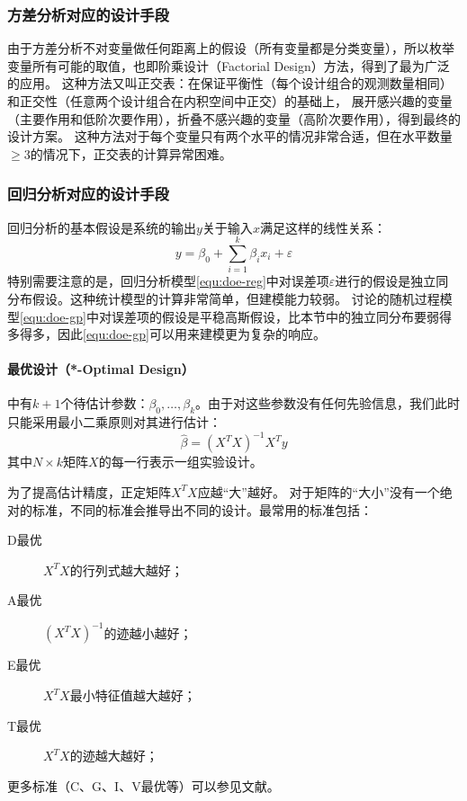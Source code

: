 \documentclass[index]{subfiles}
\begin{document}
\subsubsection{方差分析对应的设计手段}
由于方差分析不对变量做任何距离上的假设（所有变量都是分类变量），所以枚举变量所有可能的取值，也即阶乘设计（Factorial Design）方法，得到了最为广泛的应用。
这种方法又叫正交表\cite{刘瑞江2010}：在保证平衡性（每个设计组合的观测数量相同）和正交性（任意两个设计组合在内积空间中正交）的基础上，
展开感兴趣的变量（主要作用和低阶次要作用），折叠不感兴趣的变量（高阶次要作用），得到最终的设计方案。
这种方法对于每个变量只有两个水平的情况非常合适，但在水平数量$\geq3$的情况下，正交表的计算异常困难。

\subsubsection{回归分析对应的设计手段}\label{ssec:doe-reg}
回归分析的基本假设是系统的输出$y$关于输入$x$满足这样的线性关系\cite{montgomery}：
\begin{equation}\label{equ:doe-reg}
  y = \beta_0 + \sum_{i=1}^{k} \beta_i x_i + \varepsilon
\end{equation}
特别需要注意的是，回归分析模型\cref{equ:doe-reg}中对误差项$\varepsilon$进行的假设是独立同分布假设。这种统计模型的计算非常简单，但建模能力较弱。
讨论的随机过程模型\cref{equ:doe-gp}中对误差项的假设是平稳高斯假设，比本节中的独立同分布要弱得多得多，因此\cref{equ:doe-gp}可以用来建模更为复杂的响应。

\paragraph{最优设计（*-Optimal Design）}
中有$k+1$个待估计参数：$\beta_0,\ldots,\beta_k$。由于对这些参数没有任何先验信息，我们此时只能采用最小二乘原则对其进行估计\cite{aguiar1995}：
\begin{equation}\label{equ:doe-reg-sol}
  \hat{\beta} = \left(X^T X\right)^{-1} X^T y
\end{equation}
其中$N\times k$矩阵$X$的每一行表示一组实验设计。

为了提高估计精度，正定矩阵$X^T X$应越“大”越好\cite{triefenbach2008}。
对于矩阵的“大小”没有一个绝对的标准，不同的标准会推导出不同的设计。最常用的标准包括：
\begin{description}
  \item[D最优] $X^T X$的行列式越大越好；
  \item[A最优] $\left(X^T X\right)^{-1}$的迹越小越好；
  \item[E最优] $X^T X$最小特征值越大越好；
  \item[T最优] $X^T X$的迹越大越好；
\end{description}
更多标准（C、G、I、V最优等）可以参见文献。
\end{document}
